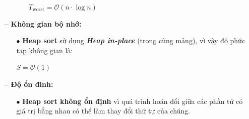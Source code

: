 \begin{itemize}
\begin{itemize}
\begin{itemize}
            \begin{center}
                $T_{\text{worst}} = \mathcal{O}(n \cdot \log n)$
            \end{center}
        \end{itemize}
    \end{itemize}
    \item [\textbf{--}] \textbf{Không gian bộ nhớ:}
    \begin{itemize}
        \item [$\bullet$] \textbf{Heap sort} sử dụng \textbf{\textit{Heap in-place}} (trong cùng mảng), vì vậy độ phức tạp không gian là:
        \begin{center}
            $S = \mathcal{O}(1)$
        \end{center}
    \end{itemize}
    \item [\textbf{--}] \textbf{Độ ổn đinh:}
    \begin{itemize}
        \item [$\bullet$] \textbf{Heap sort không ổn định} vì quá trình hoán đổi giữa các phần tử có giá trị bằng nhau có thể làm thay đổi thứ tự của chúng.
    \end{itemize}
\end{itemize}
